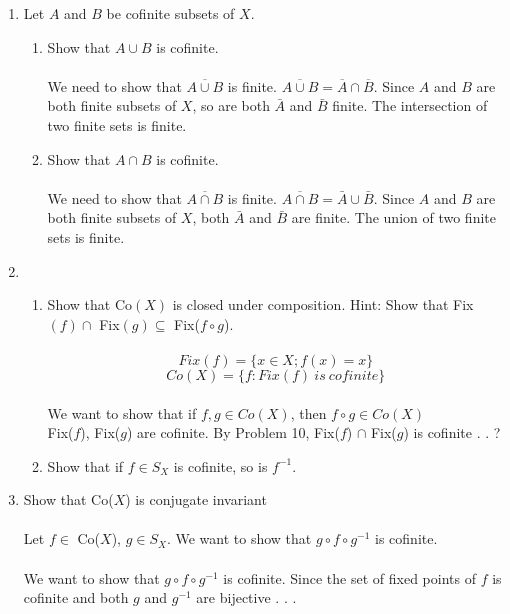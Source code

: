 \documentclass[11pt]{article}
\begin{document}
\begin{enumerate}
\newpage
\item Let $A$ and $B$ be cofinite subsets of $X$.\\
\begin{enumerate}
\item Show that $A \cup B$ is cofinite.\\\\
We need to show that $\overline{A \cup B}$ is finite.  $\overline{A \cup B} = \overline{A} \cap \overline{B}$. Since $A$ and $B$ are both finite subsets of $X$, so are both $\bar{A}$ and $\bar{B}$ finite.  The intersection of two finite sets is finite.
\item Show that $A \cap B$ is cofinite.\\\\
We need to show that $\overline{A \cap B}$ is finite.  $\overline{A \cap B} = \bar{A} \cup \bar{B}$. Since $A$ and $B$ are both finite subsets of $X$, both $\bar{A}$ and $\bar{B}$ are finite.  The union of two finite sets is finite.
\end{enumerate}

\newpage
\item
\begin{enumerate}
\item Show that Co$(X)$ is closed under composition.  Hint: Show that Fix$(f) \cap$ Fix$(g) \subseteq$ Fix($f \circ g$).\\
\\
$$Fix(f) = \{x\in X; f(x) = x\}$$
$$Co(X) = \{f : Fix(f)\ is\ cofinite\}$$
\\
We want to show that if $f,g \in Co(X)$, then $f \circ g \in Co(X)$\\
Fix($f$), Fix($g$) are cofinite.  By Problem 10, Fix($f$) $\cap$ Fix($g$) is cofinite . . ?
\\
\item Show that if $f \in S_X$ is cofinite, so is $f^{-1}$.
\end{enumerate}

\newpage
\item Show that Co($X$) is conjugate invariant
\\
\\
Let $f \in $ Co($X$), $g \in S_X$.  We want to show that $g \circ f \circ g^{-1}$ is cofinite.\\\\
We want to show that $g \circ f \circ g^{-1}$ is cofinite.  Since the set of fixed points of $f$ is cofinite and both $g$ and $g^{-1}$ are bijective . . .


\end{enumerate}
\end{document}
